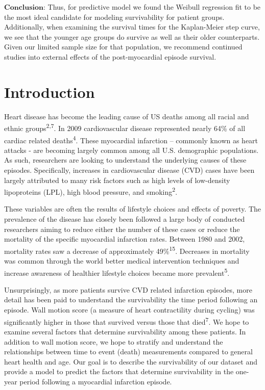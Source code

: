 \documentclass[
]{article}
\begin{document}
\(\textbf{Conclusion:}\) Thus, for predictive model we found the Weibull
regression fit to be the most ideal candidate for modeling survivability
for patient groups. Additionally, when examining the survival times for
the Kaplan-Meier step curve, we see that the younger age groups do
survive as well as their older counterparts. Given our limited sample
size for that population, we recommend continued studies into external
effects of the post-myocardial episode survival.

\newpage

\hypertarget{introduction}{%
\section{Introduction}\label{introduction}}

Heart disease has become the leading cause of US deaths among all racial
and ethnic groups\textsuperscript{2,7}. In 2009 cardiovascular disease
represented nearly 64\% of all cardiac related
deaths\textsuperscript{4}. These myocardial infarction -- commonly known
as heart attacks - are becoming largely common among all U.S.
demographic populations. As such, researchers are looking to understand
the underlying causes of these episodes. Specifically, increases in
cardiovascular disease (CVD) cases have been largely attributed to many
risk factors such as high levels of low-density lipoproteins (LPL), high
blood pressure, and smoking\textsuperscript{2}.

These variables are often the results of lifestyle choices and effects
of poverty. The prevalence of the disease has closely been followed a
large body of conducted researchers aiming to reduce either the number
of these cases or reduce the mortality of the specific myocardial
infarction rates. Between 1980 and 2002, mortality rates saw a decrease
of approximately 49\%\textsuperscript{15}. Decreases in mortality was
common through the world better medical intervention techniques and
increase awareness of healthier lifestyle choices became more
prevalent\textsuperscript{5}.

Unsurprisingly, as more patients survive CVD related infarction
episodes, more detail has been paid to understand the survivability the
time period following an episode. Wall motion score (a measure of heart
contractility during cycling) was significantly higher in those that
survived versus those that died\textsuperscript{7}. We hope to examine
several factors that determine survivability among these patients. In
addition to wall motion score, we hope to stratify and understand the
relationships between time to event (death) measurements compared to
general heart health and age. Our goal is to describe the survivability
of our dataset and provide a model to predict the factors that determine
survivability in the one-year period following a myocardial infarction
episode.
\end{document}
